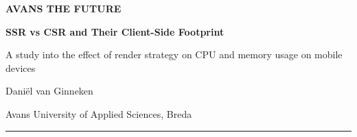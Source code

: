 \begin{titlepage}
\centering
{\small\bfseries\color{AvansTeal}AVANS THE FUTURE\par}
\vspace{1.2em}
{\Huge\bfseries\color{AvansBlue}SSR vs CSR and Their Client-Side Footprint\par}
\vspace{1.0em}
{\large A study into the effect of render strategy on CPU and memory usage on mobile devices\par}
\vfill
{\large Dani\"el van Ginneken\par}
\vspace{0.4em}
{\large Avans University of Applied Sciences, Breda\par}
\vspace{0.8em}
{\normalsize\color{AvansTeal}\rule{0.45\linewidth}{0.8pt}\par}
\end{titlepage}
